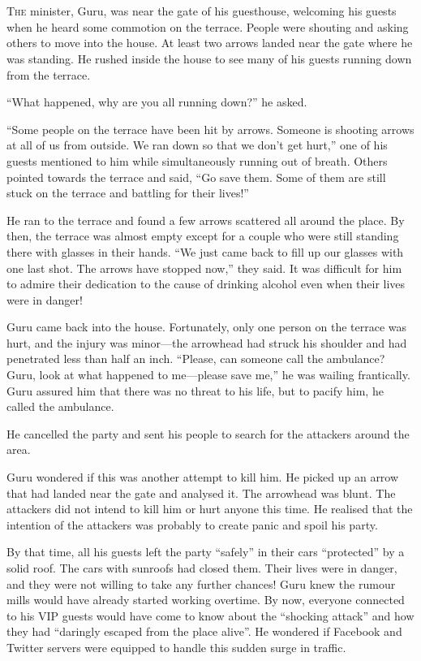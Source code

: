 \chapter{}

\lettrine{T}{he} minister, Guru, was near the gate of his guesthouse, welcoming his guests
when he heard some commotion on the terrace. People were shouting and asking
others to move into the house. At least two arrows landed near the gate where he
was standing. He rushed inside the house to see many of his guests running down
from the terrace.

“What happened, why are you all running down?” he asked.

“Some people on the terrace have been hit by arrows. Someone is shooting arrows
at all of us from outside. We ran down so that we don't get hurt,” one of his
guests mentioned to him while simultaneously running out of breath. Others
pointed towards the terrace and said, “Go save them. Some of them are still
stuck on the terrace and battling for their lives!”

He ran to the terrace and found a few arrows scattered all around the place. By
then, the terrace was almost empty except for a couple who were still standing there
with glasses in their hands. “We just came back to fill up our glasses with one
last shot. The arrows have stopped now,” they said. It was difficult for him to
admire their dedication to the cause of drinking alcohol even when their lives
were in danger!

Guru came back into the house. Fortunately, only one person on the terrace was
hurt, and the injury was minor—the arrowhead had struck his shoulder and
had penetrated less than half an inch. “Please, can someone call the
ambulance? Guru, look at what happened to me—please save me,” he was wailing
frantically. Guru assured him that there was no threat to his life, but to pacify
him, he called the ambulance.

He cancelled the party and sent his people to search for the attackers around the
area.

Guru wondered if this was another attempt to kill him. He picked up an arrow
that had landed near the gate and analysed it. The arrowhead was blunt. The
attackers did not intend to kill him or hurt anyone this time. He realised that
the intention of the attackers was probably to create panic and spoil his party.

By that time, all his guests left the party “safely” in their cars “protected” by
a solid roof. The cars with sunroofs had closed them. Their lives were
in danger, and they were not willing to take any further chances! Guru knew the
rumour mills would have already started working overtime. By now, everyone
connected to his VIP guests would have come to know about the “shocking attack”
and how they had “daringly escaped from the place alive”. He wondered if
Facebook and Twitter servers were equipped to handle this sudden surge in
traffic.


